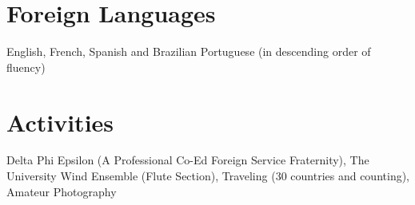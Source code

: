 \documentclass[margin,line]{resume}
\begin{document}
\begin{resume}
		\section{\mysidestyle Foreign Languages}

		English, French, Spanish and Brazilian Portuguese (in descending order of fluency)

	\section{\mysidestyle Activities}

	Delta Phi Epsilon (A Professional Co-Ed Foreign Service Fraternity), The University Wind Ensemble (Flute
	Section), Traveling (30 countries and counting), Amateur Photography


\end{resume}
\end{document}
